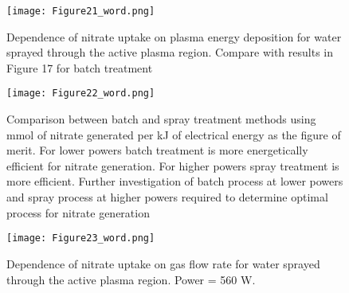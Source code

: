 \begin{figure}[htbp]
  \centering
  \texttt{[image: Figure21\_word.png]}
  \caption{Dependence of nitrate uptake on plasma energy deposition for water sprayed through the active plasma region.  Compare with results in Figure 17 for batch treatment}
  \label{fig:nitrogen_vs_energy_spray}
\end{figure}

\begin{figure}[htbp]
  \centering
  \texttt{[image: Figure22\_word.png]}
  \caption{Comparison between batch and spray treatment methods using mmol of nitrate generated per kJ of electrical energy as the figure of merit.  For lower powers batch treatment is more energetically efficient for nitrate generation.  For higher powers spray treatment is more efficient.  Further investigation of batch process at lower powers and spray process at higher powers required to determine optimal process for nitrate generation}
  \label{fig:nitro_compare_power}
\end{figure}

\begin{figure}[htbp]
  \centering
  \texttt{[image: Figure23\_word.png]}
  \caption{Dependence of nitrate uptake on gas flow rate for water sprayed through the active plasma region. Power = 560 W.}
  \label{fig:nitro_vs_flow_spray}
\end{figure}

